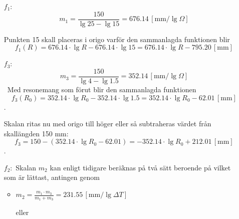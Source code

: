 \documentclass[oneside,11pt,a4paper,swedish]{scrbook}
\begin{document}
\begin{itemize}
\item[$f_1:$] \[m_1= \frac{150}{\lg 25- \lg 15}=676.14\,[\textrm{mm}/\lg \Omega]\]

Punkten 15 skall placeras i origo varför den sammanlagda funktionen blir \[f_1(R)=676.14\cdot \lg R -676.14\cdot \lg 15=676.14\cdot \lg R-795.20 \,[\textrm{mm}]\]




\item[$f_3:$] \[m_3= \frac{150}{\lg 4- \lg 1.5}=352.14\,[\textrm{mm}/\lg \Omega]\]  
\
Med resonemang som förut blir den sammanlagda funktionen  \[f_3(R_0)=352.14\cdot \lg R_0 -352.14\cdot \lg 1.5=352.14\cdot \lg R_0 - 62.01\,[\textrm{mm}]\].

Skalan ritas nu med origo till höger eller så subtraheras värdet från skallängden 150 mm: \[f_3 = 150-(352.14\cdot \lg R_0 - 62.01)= -352.14\cdot \lg R_0 + 212.01 \,[\textrm{mm}] \] .



\item[{$f_2:$}] Skalan $m_2$ kan enligt tidigare beräknas på två sätt beroende på vilket som är lättast, antingen genom

\begin{itemize}
\item $m_2= \frac{m_1 \cdot m_3}{m_1 + m_3} = 231.55 \,[\textrm{mm}/\lg \Delta T]$ 

eller 


\end{itemize}
\end{itemize}
\end{document}
